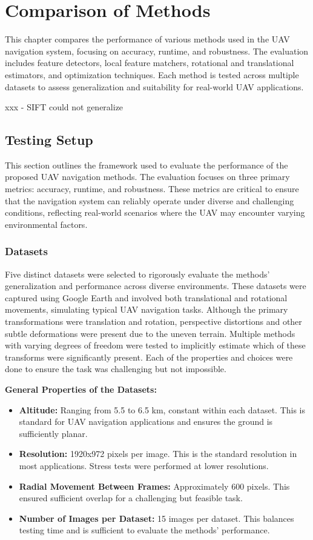 \chapter{Comparison of Methods}

This chapter compares the performance of various methods used in the UAV navigation system, focusing on accuracy, runtime, and robustness. The evaluation includes feature detectors, local feature matchers, rotational and translational estimators, and optimization techniques. Each method is tested across multiple datasets to assess generalization and suitability for real-world UAV applications.

xxx - SIFT could not generalize 
\section{Testing Setup}

This section outlines the framework used to evaluate the performance of the proposed UAV navigation methods. The evaluation focuses on three primary metrics: accuracy, runtime, and robustness. These metrics are critical to ensure that the navigation system can reliably operate under diverse and challenging conditions, reflecting real-world scenarios where the UAV may encounter varying environmental factors.

\subsection{Datasets}

Five distinct datasets were selected to rigorously evaluate the methods' generalization and performance across diverse environments. These datasets were captured using Google Earth and involved both translational and rotational movements, simulating typical UAV navigation tasks. Although the primary transformations were translation and rotation, perspective distortions and other subtle deformations were present due to the uneven terrain. Multiple methods with varying degrees of freedom were tested to implicitly estimate which of these transforms were significantly present. Each of the properties and choices were done to ensure the task was challenging but not impossible.

\textbf{General Properties of the Datasets:}
\begin{itemize}
    \item \textbf{Altitude:} Ranging from 5.5 to 6.5 km, constant within each dataset. This is standard for UAV navigation applications and ensures the ground is sufficiently planar.
    \item \textbf{Resolution:} 1920x972 pixels per image. This is the standard resolution in most applications. Stress tests were performed at lower resolutions.
    \item \textbf{Radial Movement Between Frames:} Approximately 600 pixels. This ensured sufficient overlap for a challenging but feasible task.
    \item \textbf{Number of Images per Dataset:} 15 images per dataset. This balances testing time and is sufficient to evaluate the methods' performance. 
\end{itemize}

